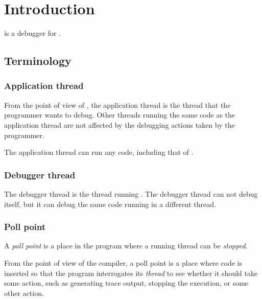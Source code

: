 \chapter{Introduction}
%

\sysname{} is a debugger for \commonlisp{}.

\section{Terminology}

%
\def\Applicationthread{Application thread}%
\def\applicationthread{application thread}%
\def\applicationthreads{application threads}%
\subsection{\Applicationthread{}}

From the point of view of \sysname{}, the \applicationthread{} is the
thread that the programmer wants to debug.  Other threads running the
same code as the \applicationthread{} are not affected by the
debugging actions taken by the programmer.

The \applicationthread{} can run any code, including that of
\sysname{}.

%
\def\Debuggerthread{Debugger thread}%
\def\debuggerthread{debugger thread}%
\def\debuggerthreads{debugger threads}%
\subsection{\Debuggerthread{}}

The \debuggerthread{} is the thread running \sysname{}.  The
\debuggerthread{} can not debug itself, but it can debug the same code
running in a different thread.

%
\def\Pollpoint{Poll point}%
\def\pollpoint{poll point}%
\def\pollpoints{poll points}%
\subsection{\Pollpoint{}}

A \emph{\pollpoint{}} is a place in the program where a running thread
can be \emph{stopped}.

From the point of view of the compiler, a \pollpoint{} is a place
where code is inserted so that the program interrogates its
\emph{thread} to see whether it should take some action, such as
generating trace output, stopping the execution, or some other
action.  

